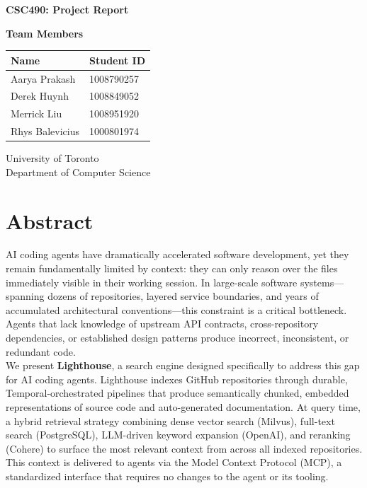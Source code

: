 \documentclass[a4paper,12pt]{article}
\begin{document}
\begin{titlepage}
    \centering
    \vspace*{1cm}
    
    \Huge
    \textbf{CSC490: Project Report}
    
    \vspace{0.5cm}
    
    \vspace{1.5cm}
    
    \textbf{Team Members}
    
    \vspace{0.8cm}
    
    \large
    \begin{tabular}{ll}
        \textbf{Name} & \textbf{Student ID} \\
        \midrule
        Aarya Prakash & 1008790257 \\
        Derek Huynh & 1008849052 \\
        Merrick Liu & 1008951920 \\
        Rhys Balevicius & 1000801974 \\
    \end{tabular}
    
    \vfill
    
    \large
    University of Toronto\\
    Department of Computer Science    
\end{titlepage}
\section{Abstract}

AI coding agents have dramatically accelerated software development, yet they
remain fundamentally limited by context: they can only reason over the files
immediately visible in their working session.
In large-scale software systems—spanning dozens of repositories, layered
service boundaries, and years of accumulated architectural conventions—this
constraint is a critical bottleneck.
Agents that lack knowledge of upstream API contracts, cross-repository
dependencies, or established design patterns produce incorrect, inconsistent, or
redundant code.\\

We present \textbf{Lighthouse}, a search engine designed
specifically to address this gap for AI coding agents.
Lighthouse indexes GitHub repositories through durable, Temporal-orchestrated
pipelines that produce semantically chunked, embedded representations of source
code and auto-generated documentation.
At query time, a hybrid retrieval strategy combining dense vector search
(Milvus), full-text search (PostgreSQL), LLM-driven keyword expansion (OpenAI), 
and reranking (Cohere) to surface the most relevant context from across all indexed repositories.
This context is delivered to agents via the Model Context Protocol (MCP), a
standardized interface that requires no changes to the agent or its tooling.
\end{document}
